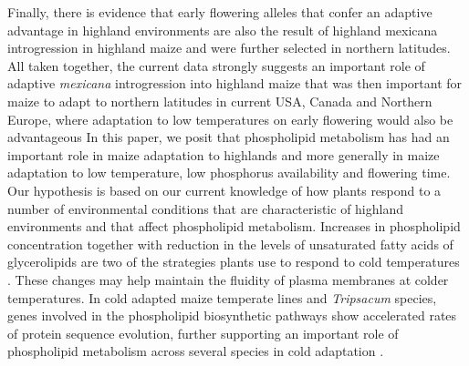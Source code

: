 \documentclass[9pt,twocolumn,twoside]{BioRxiv}
\begin{document}
Finally, there is evidence that early flowering alleles that confer an adaptive advantage in highland environments are also the result of highland mexicana introgression in highland maize \citep{Guo2018-on} and were further selected in northern latitudes. 
All taken together, the current data strongly suggests an important role of adaptive \textit{mexicana} introgression into highland maize that was then important for maize to adapt to northern latitudes in current USA, Canada and Northern Europe, where adaptation to low temperatures on early flowering would also be advantageous    
In this paper, we posit that phospholipid metabolism has had an important role in maize adaptation to highlands and more generally in maize adaptation to low temperature, low phosphorus availability and flowering time.   
Our hypothesis is based on our current knowledge of how plants respond to a number of environmental conditions that are characteristic of highland environments and that affect phospholipid metabolism. 
Increases in phospholipid concentration \citep{Degenkolbe2012-wf} together with reduction in the levels of unsaturated fatty acids of glycerolipids \citep{Welti2002-uk} are two of the strategies plants use to respond to cold temperatures \citep{Lynch1987-ln}. 
These changes may help maintain the fluidity of plasma membranes at colder temperatures.
In cold adapted maize temperate lines and \textit{Tripsacum} species, genes involved in the phospholipid biosynthetic pathways show accelerated rates of protein sequence evolution, further supporting an important role of phospholipid metabolism across several species in cold adaptation \cite{Yan2019-tx}. 
 
\end{document}
